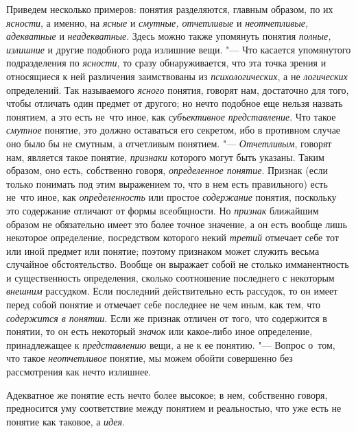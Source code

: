 Приведем несколько примеров: понятия разделяются, главным образом, по их
{\em ясности}, а именно, на {\em ясные} и {\em смутные, отчетливые} и
{\em неотчетливые, адекватные} и {\em неадекватные}. Здесь можно также
упомянуть понятия {\em полные, излишние} и другие подобного рода излишние
вещи. "--- Что касается упомянутого подразделения по {\em ясности}, то сразу
обнаруживается, что эта точка зрения и относящиеся к ней различения
заимствованы из {\em психологических}, а не {\em логических} определений. Так
называемого {\em ясного} понятия, говорят нам, достаточно для того, чтобы
отличать один предмет от другого; но нечто подобное еще нельзя назвать
понятием, а это есть не~что иное, как {\em субъективное представление}. Что
такое {\em смутное} понятие, это должно оставаться его секретом, ибо в
противном случае оно было бы не смутным, а отчетливым понятием. "---
{\em Отчетливым}, говорят нам, является такое понятие, {\em признаки} которого
могут быть указаны. Таким образом, оно есть, собственно говоря,
{\em определенное понятие}. Признак (если только понимать под этим выражением
то, что в нем есть правильного) есть не~что иное, как {\em определенность} или
простое {\em содержание} понятия, поскольку это содержание отличают от формы
всеобщности. Но {\em признак} ближайшим образом не обязательно имеет это более
точное значение, а он есть вообще лишь некоторое определение, посредством
которого некий {\em третий} отмечает себе тот или иной предмет или понятие;
поэтому признаком может служить весьма случайное обстоятельство. Вообще он
выражает собой не столько имманентность и существенность определения, сколько
соотношение последнего с некоторым {\em внешним} рассудком. Если последний
действительно есть рассудок, то он имеет перед собой понятие и отмечает себе
последнее не чем иным, как тем, что {\em содержится в понятии}. Если же
признак отличен от того, что содержится в понятии, то он
есть некоторый {\em значок} или какое-либо иное определение,
принадлежащее к {\em представлению} вещи, а не к ее понятию. "--- Вопрос
о~том, что такое {\em неотчетливое} понятие, мы можем обойти совершенно
без рассмотрения как нечто излишнее.

Адекватное же понятие есть нечто более высокое; в нем,
собственно говоря, предносится уму соответствие между понятием и
реальностью, что уже есть не понятие как таковое, а {\em идея}.

